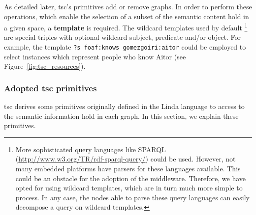 As detailed later, \ac{tsc}'s primitives add or remove graphs.
In order to perform these operations, which enable the selection of a subset of the semantic content hold in a given space, a \textbf{template} is required. %
The wildcard templates used by default
\footnote{
  More sophisticated query languages like SPARQL (\url{http://www.w3.org/TR/rdf-sparql-query/}) could be used. %
  However, not many embedded platforms have parsers for these languages available.
  This could be an obstacle for the adoption of the middleware.
  Therefore, we have opted for using wildcard templates, which are in turn much more simple to process.
  In any case, the nodes able to parse these query languages can easily decompose a query on wildcard templates.
}
are special triples with optional wildcard subject, predicate and/or object.
For example, the template \texttt{?s foaf:knows gomezgoiri:aitor} could be employed to select instances which represent people who know Aitor (see Figure~\ref{fig:tsc_resources}).




\subsubsection{Adopted \acs{tsc} primitives}
\label{sec:primitives}

\acs{tsc} derives some primitives originally defined in the Linda language \citep{gelernter_generative_1985} to access to the semantic information hold in each graph.
In this section, we explain these primitives.

